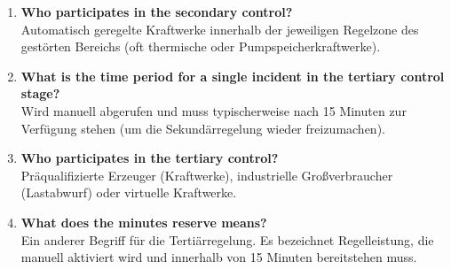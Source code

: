 \documentclass{article}
\begin{document}
\begin{enumerate}
    \item \textbf{Who participates in the secondary control?} \\
    Automatisch geregelte Kraftwerke innerhalb der jeweiligen Regelzone des gestörten Bereichs (oft thermische oder Pumpspeicherkraftwerke).
    \item \textbf{What is the time period for a single incident in the tertiary control stage?} \\
    Wird manuell abgerufen und muss typischerweise nach 15 Minuten zur Verfügung stehen (um die Sekundärregelung wieder freizumachen).
    \item \textbf{Who participates in the tertiary control?} \\
    Präqualifizierte Erzeuger (Kraftwerke), industrielle Großverbraucher (Lastabwurf) oder virtuelle Kraftwerke.
    \item \textbf{What does the minutes reserve means?} \\
    Ein anderer Begriff für die Tertiärregelung. Es bezeichnet Regelleistung, die manuell aktiviert wird und innerhalb von 15 Minuten bereitstehen muss.
\end{enumerate}
\end{document}
